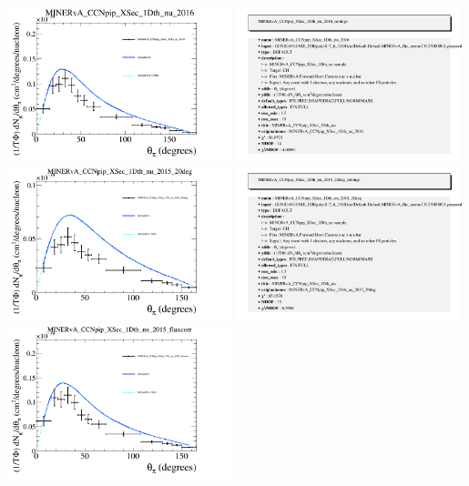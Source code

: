 \documentclass{article}
\begin{document}
\centering
\includegraphics[width=0.49\textwidth]{figures/nuisance_MINERvA_CCNpip_XSec_1Dth_nu_2016_comp.png}
\includegraphics[width=0.49\textwidth]{figures/nuisance_MINERvA_CCNpip_XSec_1Dth_nu_2016_info.png}
\centering
\includegraphics[width=0.49\textwidth]{figures/nuisance_MINERvA_CCNpip_XSec_1Dth_nu_2015_20deg_comp.png}
\includegraphics[width=0.49\textwidth]{figures/nuisance_MINERvA_CCNpip_XSec_1Dth_nu_2015_20deg_info.png}
\centering
\includegraphics[width=0.49\textwidth]{figures/nuisance_MINERvA_CCNpip_XSec_1Dth_nu_2015_fluxcorr_comp.png}
\end{document}
